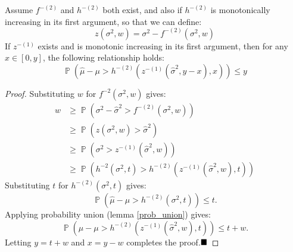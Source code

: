 \documentclass[runningheads, envcountsame, a4paper]{llncs}
\DeclareMathOperator{\p}{\mathbb{P}}
\begin{document}
\begin{theorem}\label{ebb1} 
Assume $f^{-(2)}$ and $h^{-(2)}$ both exist, and also if $h^{-(2)}$ is monotonically increasing in its first argument, so that we can define:
\[
z(\sigma^2,w) = \sigma^2-f^{-(2)}\left(\sigma^2,w\right)
\]
If $z^{-(1)}$ exists and is monotonic increasing in its first argument, then for any $x\in[0,y]$, the following relationship holds:
\[
\p\left(\hat{\mu}-\mu>h^{-(2)}\left(z^{-(1)}\left(\hat{\sigma}^2,y-x\right),x\right)\right)
\le y
\]
\end{theorem}
%
\begin{proof}
Substituting $w$ for $f^{-2}(\sigma^2,w)$ gives:
\begin{align*}
w & \ge \p\left(\sigma^2-\hat{\sigma}^2>f^{-(2)}\left(\sigma^2,w\right)\right)\\
 & \ge \p\left(z\left(\sigma^2,w\right)>\hat{\sigma}^2\right)\\
 & \ge \p\left(\sigma^2>z^{-(1)}\left(\hat{\sigma}^2,w\right)\right)\\
 & \ge \p\left(h^{-2}\left(\sigma^2,t\right)>h^{-(2)}\left(z^{-(1)}\left(\hat{\sigma}^2,w\right),t\right)\right)
\end{align*}
Substituting $t$ for $h^{-(2)}(\sigma^2,t)$ gives:
\[
\p\left(\hat{\mu}-\mu>h^{-(2)}\left(\sigma^2,t\right)\right)
\le t.
\]
Applying probability union (lemma \ref{prob_union}) gives:\\
\[
\p\left(\hat{\mu}-\mu>h^{-(2)}\left(z^{-(1)}\left(\hat{\sigma}^2,w\right),t\right)\right)
\le t+w.
\]
Letting $y=t+w$ and $x=y-w$ completes the proof.$\hfill\blacksquare$
\end{proof}
\end{document}

